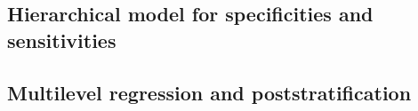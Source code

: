 \documentclass[11pt]{article}
\begin{document}
\vspace{-\baselineskip}
\begin{small}
  \begin{quotation}\noindent
    
  \end{quotation}
\end{small}


\subsection{Hierarchical model for specificities and sensitivities}\label{stan3}

\vspace{-\baselineskip}
\begin{small}
  \begin{quotation}\noindent
    
  \end{quotation}
\end{small}

\subsection{Multilevel regression and poststratification}\label{stan4}

\vspace{-\baselineskip}
\begin{small}
  \begin{quotation}\noindent
    
  \end{quotation}
\end{small}
\end{document}
